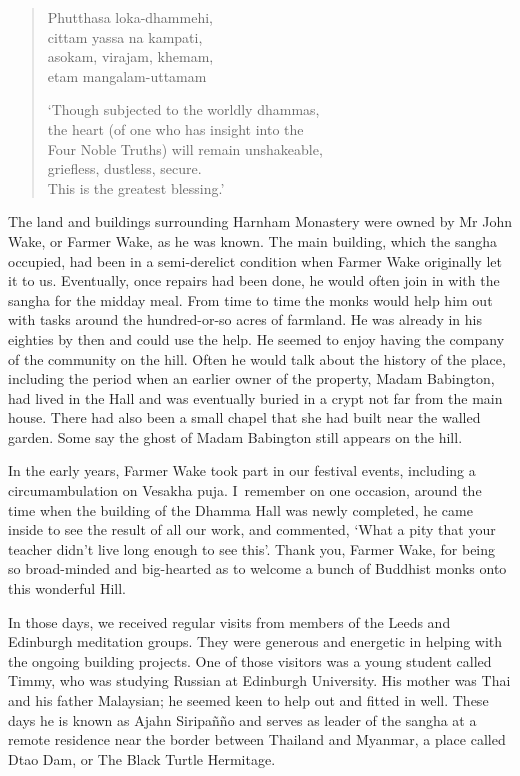 \clearpage

\begin{quote}
  Phutthasa loka-dhammehi,\\
  cittam yassa na kampati,\\
  asokam, virajam, khemam,\\
  etam mangalam-uttamam

  `Though subjected to the worldly dhammas,\\
  the heart (of one who has insight into the\\ Four Noble Truths) will remain unshakeable,\\
  griefless, dustless, secure.\\
  This is the greatest blessing.'
\end{quote}

The land and buildings surrounding Harnham Monastery were owned by Mr
John Wake, or Farmer Wake, as he was known. The main building, which the
sangha occupied, had been in a semi-derelict condition when Farmer Wake
originally let it to us. Eventually, once repairs had been done, he
would often join in with the sangha for the midday meal. From time to
time the monks would help him out with tasks around the hundred-or-so
acres of farmland. He was already in his eighties by then and could use
the help. He seemed to enjoy having the company of the community on the
hill. Often he would talk about the history of the place, including the
period when an earlier owner of the property,
Madam Babington\cite{babington}, had lived in the Hall and was eventually buried in
a crypt not far from the main house. There had also been a small chapel
that she had built near the walled garden. Some say the ghost of Madam
Babington still appears on the hill.

In the early years, Farmer Wake took part in our festival events,
including a circumambulation on Vesakha puja. I~remember on one
occasion, around the time when the building of the Dhamma Hall was newly
completed, he came inside to see the result of all our work, and
commented, `What a pity that your teacher didn't live long enough to see
this'. Thank you, Farmer Wake, for being so broad-minded and big-hearted
as to welcome a bunch of Buddhist monks onto this wonderful Hill.

In those days, we received regular visits from members of the Leeds and
Edinburgh meditation groups. They were generous and energetic in helping
with the ongoing building projects. One of those visitors was a young
student called Timmy, who was studying Russian at Edinburgh University.
His mother was Thai and his father Malaysian; he seemed keen to help out
and fitted in well. These days he is known as Ajahn Siripañño and serves
as leader of the sangha at a remote residence near the border between
Thailand and Myanmar, a place called Dtao Dam, or The Black Turtle
Hermitage.

